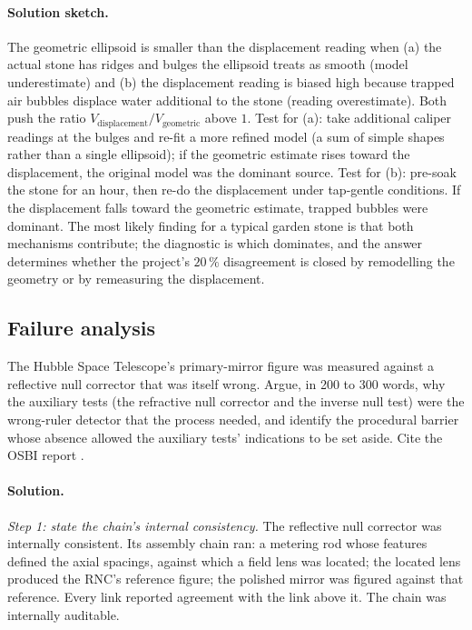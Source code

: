 \paragraph{Solution sketch.}
The geometric ellipsoid is smaller than the displacement reading
when (a) the actual stone has ridges and bulges the ellipsoid
treats as smooth (model underestimate) and (b) the displacement
reading is biased high because trapped air bubbles displace water
additional to the stone (reading overestimate). Both push the ratio
$V_{\mathrm{displacement}} / V_{\mathrm{geometric}}$ above $1$.
Test for (a): take additional caliper readings at the bulges and
re-fit a more refined model (a sum of simple shapes rather than a
single ellipsoid); if the geometric estimate rises toward the
displacement, the original model was the dominant source. Test for
(b): pre-soak the stone for an hour, then re-do the displacement
under tap-gentle conditions. If the displacement falls toward the
geometric estimate, trapped bubbles were dominant. The most likely
finding for a typical garden stone is that both mechanisms
contribute; the diagnostic is which dominates, and the answer
determines whether the project's $20\,\%$ disagreement is closed
by remodelling the geometry or by remeasuring the displacement.

\subsection*{Failure analysis}

\begin{exercise}
The Hubble Space Telescope's primary-mirror figure was measured
against a reflective null corrector that was itself wrong. Argue, in
200 to 300 words, why the auxiliary tests (the refractive null
corrector and the inverse null test) were the wrong-ruler detector
that the process needed, and identify the procedural barrier whose
absence allowed the auxiliary tests' indications to be set aside.
Cite the OSBI report \cite{acc:nasa-hubble-optical-systems-1990}.
\end{exercise}

\paragraph{Solution.}

\emph{Step 1: state the chain's internal consistency.}
The reflective null corrector was internally consistent. Its
assembly chain ran: a metering rod whose features defined the
axial spacings, against which a field lens was located; the
located lens produced the RNC's reference figure; the polished
mirror was figured against that reference. Every link reported
agreement with the link above it. The chain was internally
auditable.

